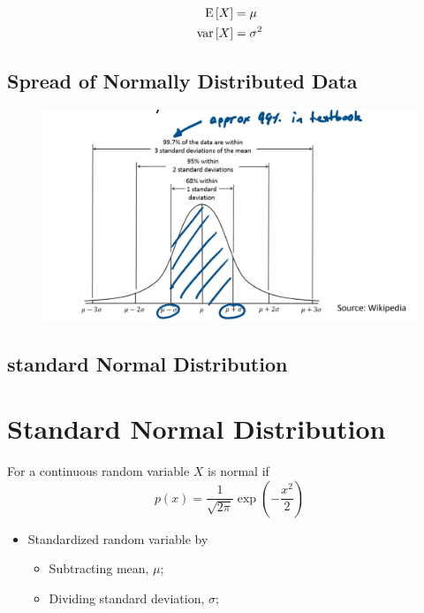     \begin{align}
      \operatorname{E} \left[ X \right] &= \mu \\
      \operatorname{var} \left[ X \right] &= \sigma^{2}
    \end{align}
    
  \subsection{Spread of Normally Distributed Data}
  
    \begin{figure}[H]
      \centering
      \includegraphics[width=\linewidth]{resources/ch5/normal-distribution-spread.png}
    \end{figure}
    
  \subsection{standard Normal Distribution}
    
\section{Standard Normal Distribution}

  For a continuous random variable $ X $ is normal if
  \begin{equation}
    p \left( x \right) = \frac{1}{\sqrt{2\pi}} \exp \left( -\frac{x^{2}}{2} \right)
  \end{equation}

  \begin{itemize}
    \item Standardized random variable by
    \begin{itemize}
      \item Subtracting mean, $ \mu $;
      \item Dividing standard deviation, $ \sigma $;
    \end{itemize}
  \end{itemize}

